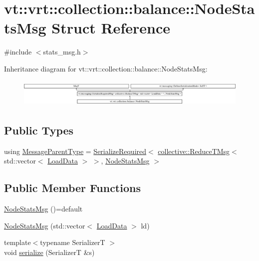 \hypertarget{structvt_1_1vrt_1_1collection_1_1balance_1_1_node_stats_msg}{}\section{vt\+:\+:vrt\+:\+:collection\+:\+:balance\+:\+:Node\+Stats\+Msg Struct Reference}
\label{structvt_1_1vrt_1_1collection_1_1balance_1_1_node_stats_msg}


{\ttfamily \#include $<$stats\+\_\+msg.\+h$>$}

Inheritance diagram for vt\+:\+:vrt\+:\+:collection\+:\+:balance\+:\+:Node\+Stats\+Msg\+:\begin{figure}[H]
\begin{center}
\leavevmode
\includegraphics[height=1.329114cm]{structvt_1_1vrt_1_1collection_1_1balance_1_1_node_stats_msg}
\end{center}
\end{figure}
\subsection*{Public Types}
\begin{DoxyCompactItemize}
\item 
using \hyperlink{structvt_1_1vrt_1_1collection_1_1balance_1_1_node_stats_msg_a912b2023b2a15f0f7cf78dca8502de91}{Message\+Parent\+Type} = \hyperlink{namespacevt_a9e60e2e8929828639383ac1d6643384d}{Serialize\+Required}$<$ \hyperlink{namespacevt_1_1collective_a28b82d5d48c9bc6e4fd738fcbf9e0f62}{collective\+::\+Reduce\+T\+Msg}$<$ std\+::vector$<$ \hyperlink{structvt_1_1vrt_1_1collection_1_1balance_1_1_load_data}{Load\+Data} $>$ $>$, \hyperlink{structvt_1_1vrt_1_1collection_1_1balance_1_1_node_stats_msg}{Node\+Stats\+Msg} $>$
\end{DoxyCompactItemize}
\subsection*{Public Member Functions}
\begin{DoxyCompactItemize}
\item 
\hyperlink{structvt_1_1vrt_1_1collection_1_1balance_1_1_node_stats_msg_a4d1c09dda8b28b2ca0b96ed19ab6ee1c}{Node\+Stats\+Msg} ()=default
\item 
\hyperlink{structvt_1_1vrt_1_1collection_1_1balance_1_1_node_stats_msg_ac060bdf23289ca43133bf59c9a7bf57c}{Node\+Stats\+Msg} (std\+::vector$<$ \hyperlink{structvt_1_1vrt_1_1collection_1_1balance_1_1_load_data}{Load\+Data} $>$ ld)
\item 
{\footnotesize template$<$typename SerializerT $>$ }\\void \hyperlink{structvt_1_1vrt_1_1collection_1_1balance_1_1_node_stats_msg_abbbc6b86695054aea2060647a512e190}{serialize} (SerializerT \&s)
\end{DoxyCompactItemize}
